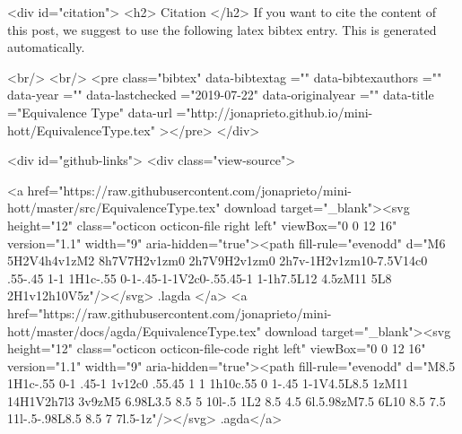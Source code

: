   
  <div id="citation">
  <h2> Citation </h2>
  If you want to cite the content of this post,
  we suggest to use the following latex bibtex entry.
  This is generated automatically.

  <br/>
  <br/>
  <pre class="bibtex"
       data-bibtextag =""
       data-bibtexauthors =""
       data-year =""
       data-lastchecked ="2019-07-22"
       data-originalyear =""
       data-title ="Equivalence Type"
       data-url ="http://jonaprieto.github.io/mini-hott/EquivalenceType.tex"
  ></pre>
  </div>
  

  <div id="github-links">
    <div class="view-source">
      
        <a href="https://raw.githubusercontent.com/jonaprieto/mini-hott/master/src/EquivalenceType.tex" download target="_blank"><svg height="12" class="octicon octicon-file right left" viewBox="0 0 12 16" version="1.1" width="9" aria-hidden="true"><path fill-rule="evenodd" d="M6 5H2V4h4v1zM2 8h7V7H2v1zm0 2h7V9H2v1zm0 2h7v-1H2v1zm10-7.5V14c0 .55-.45 1-1 1H1c-.55 0-1-.45-1-1V2c0-.55.45-1 1-1h7.5L12 4.5zM11 5L8 2H1v12h10V5z"/></svg> .lagda </a>
        <a href="https://raw.githubusercontent.com/jonaprieto/mini-hott/master/docs/agda/EquivalenceType.tex" download target="_blank"><svg height="12" class="octicon octicon-file-code right left" viewBox="0 0 12 16" version="1.1" width="9" aria-hidden="true"><path fill-rule="evenodd" d="M8.5 1H1c-.55 0-1 .45-1 1v12c0 .55.45 1 1 1h10c.55 0 1-.45 1-1V4.5L8.5 1zM11 14H1V2h7l3 3v9zM5 6.98L3.5 8.5 5 10l-.5 1L2 8.5 4.5 6l.5.98zM7.5 6L10 8.5 7.5 11l-.5-.98L8.5 8.5 7 7l.5-1z"/></svg> .agda</a>
      

